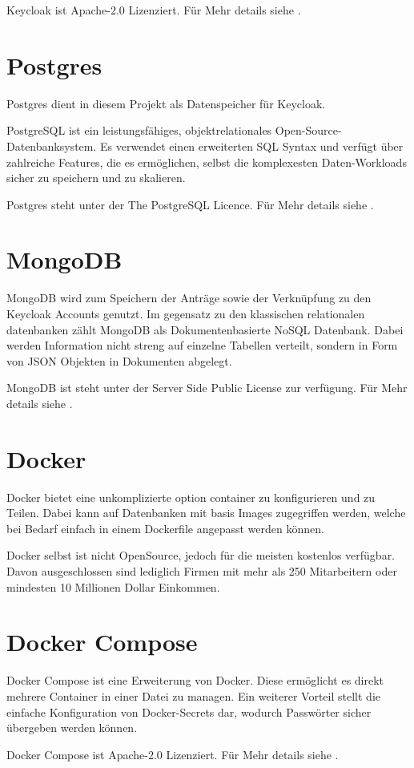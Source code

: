 Keycloak ist Apache-2.0 Lizenziert.
Für Mehr details siehe .

\section{Postgres}

Postgres dient in diesem Projekt als Datenspeicher für Keycloak.

PostgreSQL ist ein leistungsfähiges, objektrelationales Open-Source-Datenbanksystem.
Es verwendet einen erweiterten SQL Syntax und verfügt über zahlreiche Features,
die es ermöglichen, selbst die komplexesten Daten-Workloads sicher zu speichern und zu skalieren.
\cite{about-postgres}

Postgres steht unter der The PostgreSQL Licence.
Für Mehr details siehe .


\section{MongoDB}

MongoDB wird zum Speichern der Anträge sowie der Verknüpfung zu den Keycloak Accounts genutzt.
Im gegensatz zu den klassischen relationalen datenbanken zählt MongoDB als Dokumentenbasierte NoSQL Datenbank.
Dabei werden Information nicht streng auf einzelne Tabellen verteilt, sondern in Form von \ac{JSON} Objekten in Dokumenten abgelegt.

MongoDB ist steht unter der Server Side Public License zur verfügung.
Für Mehr details siehe .

\section{Docker}

Docker bietet eine unkomplizierte option container zu konfigurieren und zu Teilen.
Dabei kann auf Datenbanken mit basis Images zugegriffen werden, welche bei Bedarf
einfach in einem Dockerfile angepasst werden können.

Docker selbst ist nicht OpenSource, jedoch für die meisten kostenlos verfügbar.
Davon ausgeschlossen sind lediglich Firmen mit mehr als 250 Mitarbeitern oder mindesten 10 Millionen Dollar Einkommen.

\section{Docker Compose}

Docker Compose ist eine Erweiterung von Docker.
Diese ermöglicht es direkt mehrere Container in einer Datei zu managen.
Ein weiterer Vorteil stellt die einfache Konfiguration von Docker-Secrets dar, wodurch \ua Passwörter sicher übergeben werden können.

Docker Compose ist Apache-2.0 Lizenziert.
Für Mehr details siehe .
